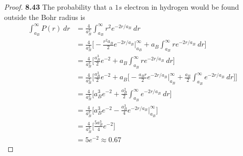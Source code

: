 \documentclass[11pt]{article}
\theoremstyle{definition}
\begin{document}
\cleardoublepage
\begin{proof}{\textbf{8.43}}
The probability that a $1s$ electron in hydrogen would be found outside the
Bohr radius is 
\begin{align*}
    \int_{a_B}^\infty P(r)~dr
    &= \frac{4}{a_B^3}\int_{a_B}^\infty r^2e^{-2r/a_B}~dr\\
    &= \frac{4}{a_B^3}\bigg[
        -\frac{r^2a_B}{2}e^{-2r/a_B}\bigg|_{a_B}^\infty
        + a_B\int_{a_B}^\infty re^{-2r/a_B}~dr
    \bigg]\\
    &= \frac{4}{a_B^3}\bigg[
        \frac{a_B^3}{2}e^{-2} + a_B\int_{a_B}^\infty re^{-2r/a_B}~dr
    \bigg]\\
    &= \frac{4}{a_B^3}\bigg[
        \frac{a_B^3}{2}e^{-2} + a_B\bigg[
            -\frac{a_Br}{2}e^{-2r/a_B}\bigg|_{a_B}^\infty
            + \frac{a_B}{2}\int_{a_B}^\infty e^{-2r/a_B}~dr
        \bigg]
    \bigg]\\
    &= \frac{4}{a_B^3}\bigg[
        a_B^3e^{-2}
        + \frac{a_B^2}{2}\int_{a_B}^\infty e^{-2r/a_B}~dr
    \bigg]\\
    &= \frac{4}{a_B^3}\bigg[
        a_B^3e^{-2} - \frac{a_B^3}{4} e^{-2r/a_B}\bigg|_{a_B}^\infty
    \bigg]\\
    &= \frac{4}{a_B^3}\bigg[\frac{5a_B^3}{4}e^{-2}\bigg]\\
    &= 5e^{-2} \approx 0.67
\end{align*}
\end{proof}
\end{document}
